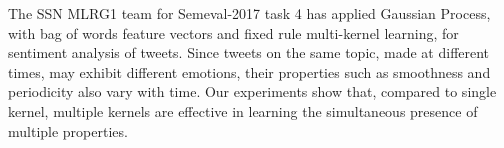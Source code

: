 The SSN MLRG1 team for Semeval-2017 task 4 has applied Gaussian Process, with bag of words feature vectors and fixed rule multi-kernel learning, for sentiment analysis of tweets. Since tweets on the same topic, made at different times, may exhibit different emotions, their properties such as smoothness and periodicity also vary with time. Our experiments show that, compared to single kernel, multiple kernels are effective in learning the simultaneous presence of multiple properties.
